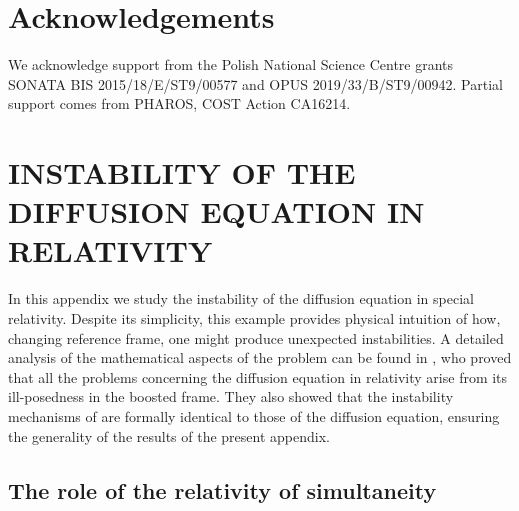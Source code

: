 \documentclass[a4paper, amsfonts, amssymb, amsmath, reprint, showkeys, nofootinbib, twoside]{revtex4-1}
\begin{document}
\section*{Acknowledgements}

We acknowledge support from the Polish National Science Centre grants SONATA BIS 2015/18/E/ST9/00577 and OPUS 2019/33/B/ST9/00942. Partial support comes from PHAROS, COST Action CA16214.

\appendix

\section{INSTABILITY OF THE DIFFUSION EQUATION IN RELATIVITY}
\label{AAA}

In this appendix we study the instability of the diffusion equation in special relativity. Despite its simplicity, this example provides physical intuition of how, changing reference frame, one might produce unexpected instabilities. 
A detailed analysis of the mathematical aspects of the problem can be found in \citet{Kost2000}, who proved that all the problems concerning the diffusion equation in relativity arise from its ill-posedness in the boosted frame. They also showed that the instability mechanisms of \citet{landau6} are formally identical to those of the diffusion equation, ensuring the generality of the results of the present appendix.



\subsection{The role of the relativity of simultaneity}
\end{document}
